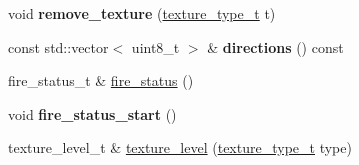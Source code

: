 \begin{DoxyCompactItemize}
void {\bfseries remove\+\_\+texture} (\hyperlink{structroom__data_a9552b46091ee649079e41f04f9543b8e}{texture\+\_\+type\+\_\+t} t)
\item 
\mbox{\label{structroom__data_a5b0f4da4c7c51f80c704c686045ed331}} 
const std\+::vector$<$ uint8\+\_\+t $>$ \& {\bfseries directions} () const
\item 
fire\+\_\+status\+\_\+t \& \hyperlink{structroom__data_a94b548a90fd4952075ab44b2622432a7}{fire\+\_\+status} ()
\item 
\mbox{\label{structroom__data_ae276d39f5763333989a885be8c1d748b}} 
void {\bfseries fire\+\_\+status\+\_\+start} ()
\item 
texture\+\_\+level\+\_\+t \& \hyperlink{structroom__data_aae0acfa6fdd06020915943202f3826c2}{texture\+\_\+level} (\hyperlink{structroom__data_a9552b46091ee649079e41f04f9543b8e}{texture\+\_\+type\+\_\+t} type)
\end{DoxyCompactItemize}
